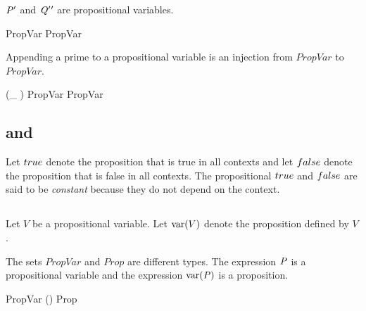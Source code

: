 \documentclass[11pt, oneside]{article}
\begin{document}
\begin{example}
$\mathit{P} {'}$ and $\mathit{Q} {'} {'}$ are propositional variables.

\begin{zed}
	\propP \propPrime \in PropVar
\also
	\propQ \propPrime \propPrime \in PropVar
\end{zed}

\end{example}

\begin{remark}
Appending a prime to a propositional variable is an injection from $PropVar$ to $PropVar$.

\begin{zed}
	(\_ \propPrime) \in PropVar \inj PropVar
\end{zed}

\end{remark}

\subsection{ and }

Let $true$ denote the proposition that is true in all contexts and
let $false$ denote the proposition that is false in all contexts.
The propositional $true$ and $false$ are said to be {\it constant} because they do not
depend on the context.

\subsection{}

Let $V$ be a propositional variable.
Let $\operatorname{var}(V)$ denote the proposition defined by $V$.

\begin{remark}
The sets $PropVar$ and $Prop$ are different types.
The expression $\mathit{P}$ is a propositional variable and the expression $\operatorname{var}(\mathit{P})$ is a proposition.

\begin{zed}
	\propP \in PropVar
\also
	\varProp(\propP) \in Prop
\end{zed}

\end{remark}

\subsection{}
\end{document}
